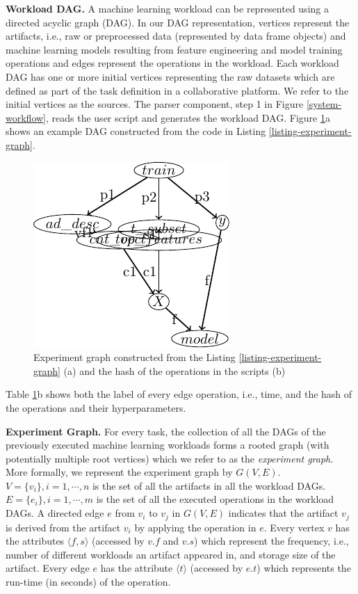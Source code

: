 \textbf{Workload DAG.}
A machine learning workload can be represented using a directed acyclic graph (DAG).
In our DAG representation, vertices represent the artifacts, i.e., raw or preprocessed data (represented by data frame objects) and machine learning models resulting from feature engineering and model training operations and edges represent the operations in the workload.
Each workload DAG has one or more initial vertices representing the raw datasets which are defined as part of the task definition in a collaborative platform.
We refer to the initial vertices as the sources.
The parser component, step 1 in Figure \ref{system-workflow}, reads the user script and generates the workload DAG.
Figure \ref{fig-experiment-graph}a shows an example DAG constructed from the code in Listing \ref{listing-experiment-graph}.
\begin{figure}
\centering
\includegraphics[width=0.8\linewidth]{../images/tikz-standalone/example-graph}
\caption{Experiment graph constructed from the Listing \ref{listing-experiment-graph} (a) and the hash of the operations in the scripts (b)}
\label{fig-experiment-graph}
\end{figure}
Table \ref{fig-experiment-graph}b shows both the label of every edge operation, i.e., time, and the hash of the operations and their hyperparameters.

\textbf{Experiment Graph. }
For every task, the collection of all the DAGs of the previously executed machine learning workloads forms a rooted graph (with potentially multiple root vertices) which we refer to as the \textit{experiment graph}.
More formally, we represent the experiment graph by $G(V, E)$.
$V=\{v_i\}, i = 1, \cdots, n$ is the set of all the artifacts in all the workload DAGs.
$E=\{e_i\}, i = 1, \cdots, m$ is the set of all the executed operations in the workload DAGs.
A directed edge $e$ from $v_i$ to $v_j$ in $G(V, E)$ indicates that the artifact $v_j$ is derived from the artifact $v_i$ by applying the operation in $e$.
Every vertex $v$ has the attributes $\langle f, s \rangle$ (accessed by $v.f$ and $v.s$) which represent the frequency, i.e., number of different workloads an artifact appeared in, and storage size of the artifact.
Every edge $e$ has the attribute $\langle t \rangle$ (accessed by $e.t$) which represents the run-time (in seconds) of the operation.

